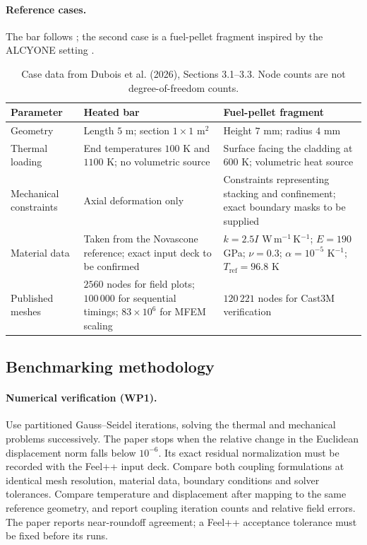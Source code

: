 \paragraph{Reference cases.}
The bar follows ; the second case is a fuel-pellet
fragment inspired by the ALCYONE setting \cite{introiini_alcyone_2024}.
\begin{table}[!ht]
\centering\small
\begin{tabularx}{\textwidth}{@{}>{\raggedright\arraybackslash}p{}>{\raggedright\arraybackslash}X>{\raggedright\arraybackslash}X@{}}
\toprule
\textbf{Parameter} & \textbf{Heated bar} & \textbf{Fuel-pellet fragment} \\
\midrule
Geometry & Length $5$ m; section $1\times1$ m$^2$ & Height $7$ mm; radius $4$ mm \\
Thermal loading & End temperatures $100$ K and $1100$ K; no volumetric source & Surface facing the cladding at $600$ K; volumetric heat source \\
Mechanical constraints & Axial deformation only & Constraints representing stacking and confinement; exact boundary masks to be supplied \\
Material data & Taken from the Novascone reference; exact input deck to be confirmed & $k=2.5I$ W\,m$^{-1}$\,K$^{-1}$; $E=190$ GPa; $\nu=0.3$; $\alpha=10^{-5}$ K$^{-1}$; $T_{\mathrm{ref}}=96.8$ K \\
Published meshes & $2560$ nodes for field plots; $100\,000$ for sequential timings; $83\times10^6$ for MFEM scaling & $120\,221$ nodes for Cast3M verification \\
\bottomrule
\end{tabularx}
\caption{Case data from Dubois et al. (2026), Sections 3.1--3.3. Node counts are not degree-of-freedom counts.}
\label{tab:app:thermomeca:cases}
\end{table}

\subsection{Benchmarking methodology}
\paragraph{Numerical verification (WP1).}
Use partitioned Gauss--Seidel iterations, solving the thermal and mechanical
problems successively. The paper stops when the relative change in the
Euclidean displacement norm falls below $10^{-6}$. Its exact residual
normalization must be recorded with the Feel++ input deck.
Compare both coupling formulations at identical mesh resolution, material data,
boundary conditions and solver tolerances. Compare temperature and displacement
after mapping to the same reference geometry, and report coupling iteration
counts and relative field errors. The paper reports near-roundoff agreement;
a Feel++ acceptance tolerance must be fixed before its runs.

